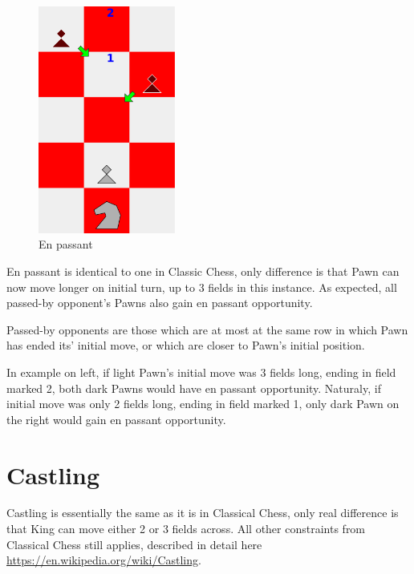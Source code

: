 \documentclass[a5paper,12pt,draft]{book} %
\begin{document}
\noindent
\begin{figure}
\includegraphics[width=0.4\textwidth, keepaspectratio=true]{../gfx/en_passants/04_croatian_ties_en_passant.png}
\caption{En passant}
\label{fig:cc_en_passant}
\end{figure}
En passant is identical to one in Classic Chess, only difference is that Pawn can now
move longer on initial turn, up to 3 fields in this instance. As expected, all passed-by
opponent's Pawns also gain en passant opportunity.

Passed-by opponents are those which are at most at the same row in which Pawn has ended its'
initial move, or which are closer to Pawn's initial position.

In example on left, if light Pawn's initial move was 3 fields long, ending in field marked 2,
both dark Pawns would have en passant opportunity. Naturaly, if initial move was only 2 fields
long, ending in field marked 1, only dark Pawn on the right would gain en passant opportunity.

\clearpage

\section*{Castling}

Castling is essentially the same as it is in Classical Chess, only real difference is that
King can move either 2 or 3 fields across. All other constraints from Classical Chess still
applies, described in detail here \\
\href{https://en.wikipedia.org/wiki/Castling}{https://en.wikipedia.org/wiki/Castling}.
\end{document}
